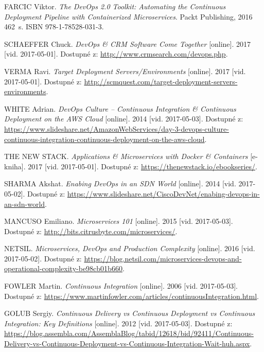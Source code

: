 \documentclass[FM,DP]{tulthesis}
\begin{document}
\appendix
\begin{thebibliography}{Mm99} 


FARCIC Viktor. 
\emph{The DevOps 2.0 Toolkit: Automating the Continuous Deployment Pipeline with Containerized Microservices}. 
Packt Publishing, 2016 462~s. ISBN 978-1-78528-031-3.

SCHAEFFER Chuck. 
\emph{DevOps \& CRM Software Come Together} [online]. 
2017 [vid. 2017-05-01]. Dostupné z: 
\url{http://www.crmsearch.com/devops.php}.

VERMA Ravi. 
\emph{Target Deployment Servers/Environments} [online]. 
2017 [vid. 2017-05-01]. Dostupné z: 
\url{http://scmquest.com/target-deployment-servers-environments}.

WHITE Adrian. 
\emph{DevOps Culture -- Continuous Integration \& Continuous Deployment on the AWS Cloud} [online]. 
2014 [vid. 2017-05-03]. Dostupné z: 
\url{https://www.slideshare.net/AmazonWebServices/day-3-devops-culture-continuous-integration-continuous-deployment-on-the-aws-cloud}.


THE NEW STACK. 
\emph{Applications \& Microservices with Docker \& Containers} [e-kniha]. 
2017 [vid. 2017-05-01]. Dostupné z: \url{https://thenewstack.io/ebookseries/}.

SHARMA Akshat. 
\emph{Enabing DevOps in an SDN World} [online]. 
2014 [vid. 2017-05-02]. Dostupné z: 
\url{https://www.slideshare.net/CiscoDevNet/enabing-devops-in-an-sdn-world}.

MANCUSO Emiliano. 
\emph{Microservices 101} [online]. 
2015 [vid. 2017-05-03]. Dostupné z: 
\url{http://bits.citrusbyte.com/microservices/}.

NETSIL. 
\emph{Microservices, DevOps and Production Complexity} [online]. 
2016 [vid. 2017-05-02]. Dostupné z: 
\url{https://blog.netsil.com/microservices-devops-and-operational-complexity-be98cb01b660}.


FOWLER Martin. 
\emph{Continuous Integration} [online]. 
2006 [vid. 2017-05-03]. Dostupné z: 
\url{https://www.martinfowler.com/articles/continuousIntegration.html}.

GOLUB Sergiy. 
\emph{Continuous Delivery vs Continuous Deployment vs Continuous Integration: Key Definitions} [online]. 
2012 [vid. 2017-05-03]. Dostupné z: 
\url{https://blog.assembla.com/AssemblaBlog/tabid/12618/bid/92411/Continuous-Delivery-vs-Continuous-Deployment-vs-Continuous-Integration-Wait-huh.aspx}.


\end{thebibliography}
\end{document}
